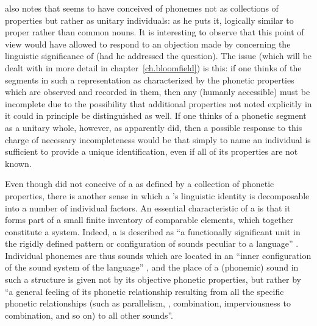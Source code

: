 \citet{mccawley67:sapir} also notes that {\Sapir} seems to have conceived of
phonemes not as collections of properties but rather as unitary
individuals: as he puts it, logically similar to proper rather than
common nouns. It is interesting to observe that this point of view
would have allowed {\Sapir} to respond to an objection made by {\Bloomfield}
concerning the linguistic significance of 
(had he addressed the question). The issue (which will be dealt with
in more detail in chapter~\ref{ch.bloomfield}) is this: if one thinks
of the segments in such a representation as characterized by the
phonetic properties which are observed and recorded in them, then any
(humanly accessible)  must be incomplete due to
the possibility that additional properties not noted explicitly in it
could in principle be distinguished as well. If one thinks of a
phonetic segment as a unitary whole, however, as {\Sapir} apparently did,
then a possible response to this charge of necessary incompleteness
would be that simply to name an individual is sufficient to provide a
unique identification, even if all of its properties are not known.

Even though {\Sapir} did not conceive of a  as defined by a
collection of phonetic properties, there is another sense in which a
's linguistic identity is decomposable into a number of
individual factors. An essential characteristic of a  is that
it forms part of a small finite inventory of comparable elements,
which together constitute a system. Indeed, a  is described as
``a functionally significant unit in the rigidly defined pattern or
configuration of sounds peculiar to a language''
\citep[46]{sapir33:reality}. Individual phonemes are thus sounds which
are located in an ``inner configuration of the sound system of the
language'' \citep[41f.]{sapir25:sound.patterns}, and the place of a
(phonemic) sound in such a structure is given not by its objective
phonetic properties, but rather by ``a general feeling of its phonetic
relationship resulting from all the specific phonetic relationships
(such as parallelism, , combination, imperviousness to
combination, and so on) to all other sounds''.

